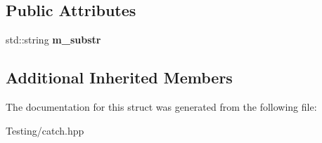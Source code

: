 \subsection*{Public Attributes}
\begin{DoxyCompactItemize}
\item 
\hypertarget{struct_catch_1_1_matchers_1_1_impl_1_1_std_string_1_1_contains_a0bad82dd7cbdd0ec06b6d562181db03e}{std\-::string {\bfseries m\-\_\-substr}}\label{struct_catch_1_1_matchers_1_1_impl_1_1_std_string_1_1_contains_a0bad82dd7cbdd0ec06b6d562181db03e}

\end{DoxyCompactItemize}
\subsection*{Additional Inherited Members}


The documentation for this struct was generated from the following file\-:\begin{DoxyCompactItemize}
\item 
Testing/catch.\-hpp\end{DoxyCompactItemize}
